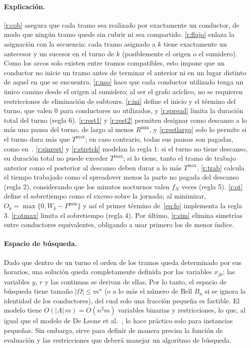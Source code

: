 \documentclass[letter, 10pt]{article}
\begin{document}
\paragraph{Explicación.}
\eqref{r:cob} asegura que cada tramo sea realizado por exactamente un conductor, de modo que ningún tramo quede sin cubrir ni sea compartido. \eqref{r:flujo} enlaza la asignación con la secuencia: cada tramo asignado a $k$ tiene exactamente un antecesor y un sucesor en el turno de $k$ (posiblemente el origen o el sumidero). Como los arcos solo existen entre tramos compatibles, esto impone que un conductor no inicie un tramo antes de terminar el anterior ni en un lugar distinto de aquel en que se encuentra. \eqref{r:uso} hace que cada conductor utilizado tenga un único camino desde el origen al sumidero; al ser el grafo acíclico, no se requieren restricciones de eliminación de subtours. \eqref{r:ini} define el inicio y el término del turno, que valen 0 para conductores no utilizados, y \eqref{r:spread} limita la duración total del turno (regla 6). \eqref{r:rest1} y \eqref{r:rest2} permiten designar como descanso a lo más una pausa del turno, de largo al menos $R^{\min}$, y \eqref{r:restlargo} solo lo permite si el turno dura más que $T^{\max}$; en caso contrario, todas sus pausas son pagadas, como en~\cite{Constantino2017}. \eqref{r:sinrest} y \eqref{r:stretch} modelan la regla 1: si el turno no tiene descanso, su duración total no puede exceder $T^{\max}$; si lo tiene, tanto el tramo de trabajo anterior como el posterior al descanso deben durar a lo más $T^{\max}$. \eqref{r:trab} calcula el tiempo trabajado como el spreadover menos la parte no pagada del descanso (regla 2), considerando que los minutos nocturnos valen $f_N$ veces (regla 5). \eqref{r:ot} define el sobretiempo como el exceso sobre la jornada; al minimizar, $O_k=\max\{0,W_k-P^{\min}\}$ y así el primer término de~\eqref{eq:fo} implementa la regla 3. \eqref{r:otmax} limita el sobretiempo (regla 4). Por último, \eqref{r:sim} elimina simetrías entre conductores equivalentes, obligando a usar primero los de menor índice.

\paragraph{Espacio de búsqueda.}
Dado que dentro de un turno el orden de los tramos queda determinado por sus horarios, una solución queda completamente definida por las variables $x_{jk}$; las variables $y$, $r$ y las continuas se derivan de ellas. Por lo tanto, el espacio de búsqueda tiene tamaño $|\Omega|\leq m^{n}$ (o a lo más el número de Bell $B_n$ si se ignora la identidad de los conductores), del cual solo una fracción pequeña es factible. El modelo tiene $O(|A|\,m)=O(n^2m)$ variables binarias y restricciones, lo que, al igual que el modelo de De Leone et al.~\cite{DeLeone2011a}, lo hace práctico solo para instancias pequeñas. Sin embargo, sirve para definir de manera precisa la función de evaluación y las restricciones que deberá manejar un algoritmo de búsqueda.
\end{document}
